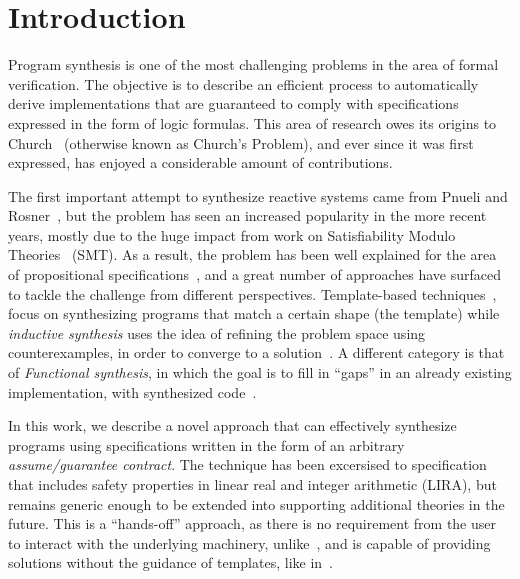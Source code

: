 
\section{Introduction}

Program synthesis is one of the most challenging problems in the area of formal verification. The objective is to describe an efficient process to automatically derive implementations that are guaranteed to comply with specifications expressed in the form of logic formulas. This area of research owes its origins to Church~\cite{church1962logic} (otherwise known as Church's Problem), and ever since it was first expressed, has enjoyed a considerable amount of contributions.

The first important attempt to synthesize reactive systems came from Pnueli and Rosner~\cite{pnueli1989synthesis}, but the problem has seen an increased popularity in the more recent years, mostly due to the huge impact from work on Satisfiability Modulo Theories~\cite{BarFT-SMTLIB} (SMT). As a result, the problem has been well explained for the area of propositional specifications~\cite{gulwani2010dimensions}, and a great number of approaches have surfaced to tackle the challenge from different perspectives. Template-based techniques~\cite{srivastava2013template}, focus on synthesizing programs that
match a certain shape (the template) while {\em inductive synthesis} uses the idea of refining the problem space using counterexamples, in order to converge to a solution~\cite{flener2001inductive}. A different category is that of \textit{Functional synthesis}, in which the goal is to fill in ``gaps'' in an already existing implementation, with synthesized code~\cite{kuncak2013functional}.

In this work, we describe a novel approach that can effectively synthesize
programs using specifications written in the form of an arbitrary {\em
assume/guarantee contract}. The technique has been excersised to specification
that includes safety properties in linear real and integer arithmetic (LIRA),
but remains generic enough to be extended into supporting additional theories
in the future. This is a ``hands-off'' approach, as there is no
requirement from the user to interact with the underlying machinery,
unlike~\cite{ryzhyk2014user,ryzhyk2016developing}, and is capable of providing solutions without the guidance of templates, like
in~\cite{beyene2014constraint}.

